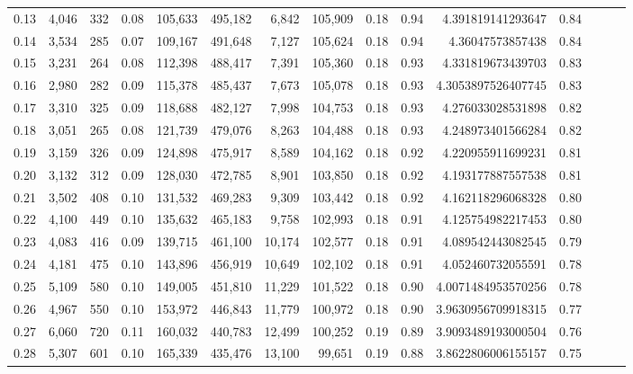 \begin{tabular}{rrrrrrrrrrrrrrr}
0.13 &   4,046 &    332 &  0.08 &  105,633 &  495,182 &    6,842 &  105,909 &  0.18 &  0.94 &     4.391819141293647 &      0.84 \\
0.14 &   3,534 &    285 &  0.07 &  109,167 &  491,648 &    7,127 &  105,624 &  0.18 &  0.94 &      4.36047573857438 &      0.84 \\
0.15 &   3,231 &    264 &  0.08 &  112,398 &  488,417 &    7,391 &  105,360 &  0.18 &  0.93 &     4.331819673439703 &      0.83 \\
0.16 &   2,980 &    282 &  0.09 &  115,378 &  485,437 &    7,673 &  105,078 &  0.18 &  0.93 &    4.3053897526407745 &      0.83 \\
0.17 &   3,310 &    325 &  0.09 &  118,688 &  482,127 &    7,998 &  104,753 &  0.18 &  0.93 &     4.276033028531898 &      0.82 \\
0.18 &   3,051 &    265 &  0.08 &  121,739 &  479,076 &    8,263 &  104,488 &  0.18 &  0.93 &     4.248973401566284 &      0.82 \\
0.19 &   3,159 &    326 &  0.09 &  124,898 &  475,917 &    8,589 &  104,162 &  0.18 &  0.92 &     4.220955911699231 &      0.81 \\
0.20 &   3,132 &    312 &  0.09 &  128,030 &  472,785 &    8,901 &  103,850 &  0.18 &  0.92 &     4.193177887557538 &      0.81 \\
0.21 &   3,502 &    408 &  0.10 &  131,532 &  469,283 &    9,309 &  103,442 &  0.18 &  0.92 &     4.162118296068328 &      0.80 \\
0.22 &   4,100 &    449 &  0.10 &  135,632 &  465,183 &    9,758 &  102,993 &  0.18 &  0.91 &     4.125754982217453 &      0.80 \\
0.23 &   4,083 &    416 &  0.09 &  139,715 &  461,100 &   10,174 &  102,577 &  0.18 &  0.91 &     4.089542443082545 &      0.79 \\
0.24 &   4,181 &    475 &  0.10 &  143,896 &  456,919 &   10,649 &  102,102 &  0.18 &  0.91 &     4.052460732055591 &      0.78 \\
0.25 &   5,109 &    580 &  0.10 &  149,005 &  451,810 &   11,229 &  101,522 &  0.18 &  0.90 &    4.0071484953570256 &      0.78 \\
0.26 &   4,967 &    550 &  0.10 &  153,972 &  446,843 &   11,779 &  100,972 &  0.18 &  0.90 &    3.9630956709918315 &      0.77 \\
0.27 &   6,060 &    720 &  0.11 &  160,032 &  440,783 &   12,499 &  100,252 &  0.19 &  0.89 &    3.9093489193000504 &      0.76 \\
0.28 &   5,307 &    601 &  0.10 &  165,339 &  435,476 &   13,100 &   99,651 &  0.19 &  0.88 &    3.8622806006155157 &      0.75 \\

\end{tabular}
